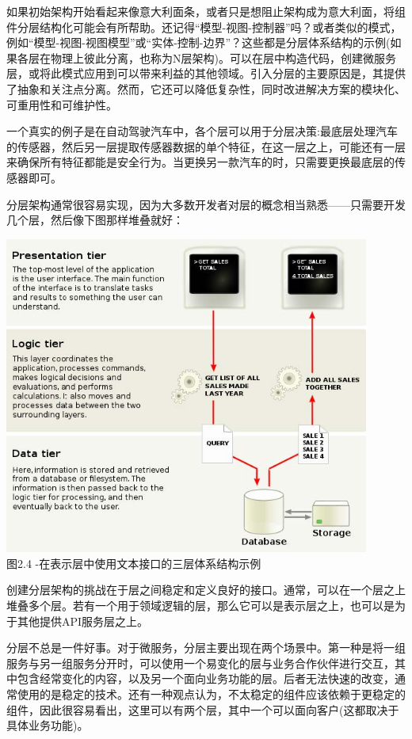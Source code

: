 

如果初始架构开始看起来像意大利面条，或者只是想阻止架构成为意大利面，将组件分层结构化可能会有所帮助。还记得“模型-视图-控制器”吗？或者类似的模式，例如“模型-视图-视图模型”或“实体-控制-边界”？这些都是分层体系结构的示例(如果各层在物理上彼此分离，也称为N层架构)。可以在层中构造代码，创建微服务层，或将此模式应用到可以带来利益的其他领域。引入分层的主要原因是，其提供了抽象和关注点分离。然而，它还可以降低复杂性，同时改进解决方案的模块化、可重用性和可维护性。

一个真实的例子是在自动驾驶汽车中，各个层可以用于分层决策:最底层处理汽车的传感器，然后另一层提取传感器数据的单个特征，在这一层之上，可能还有一层来确保所有特征都能是安全行为。当更换另一款汽车的时，只需要更换最底层的传感器即可。

分层架构通常很容易实现，因为大多数开发者对层的概念相当熟悉——只需要开发几个层，然后像下图那样堆叠就好：

\begin{center}
\includegraphics[width=0.9\textwidth]{content/1/chapter2/images/4.jpg}\\
图2.4 -在表示层中使用文本接口的三层体系结构示例
\end{center}

创建分层架构的挑战在于层之间稳定和定义良好的接口。通常，可以在一个层之上堆叠多个层。若有一个用于领域逻辑的层，那么它可以是表示层之上，也可以是为于其他提供API服务层之上。

分层不总是一件好事。对于微服务，分层主要出现在两个场景中。第一种是将一组服务与另一组服务分开时，可以使用一个易变化的层与业务合作伙伴进行交互，其中包含经常变化的内容，以及另一个面向业务功能的层。后者无法快速的改变，通常使用的是稳定的技术。还有一种观点认为，不太稳定的组件应该依赖于更稳定的组件，因此很容易看出，这里可以有两个层，其中一个可以面向客户(这都取决于具体业务功能)。

